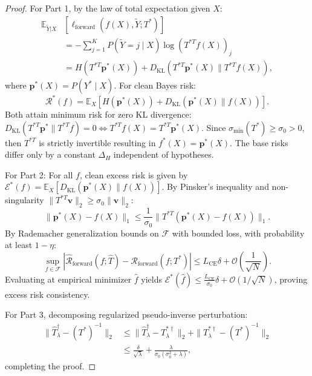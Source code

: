 \documentclass[10pt,journal]{IEEEtran}
\begin{document}
\begin{proof}
For Part 1, by the law of total expectation given $X$:
\begin{align}
    \mathbb{E}_{\tilde{Y}|X}&\left[\ell_{\mathrm{forward}}(f(X), \tilde{Y}; T^*)\right] \nonumber \\
    &= -\sum_{j=1}^K P(\tilde{Y}=j \mid X) \log (T^{*T} f(X))_j \nonumber \\
    &= H(T^{*T} \mathbf{p}^*(X)) + D_{\mathrm{KL}}(T^{*T} \mathbf{p}^*(X) \parallel T^{*T} f(X)),
\end{align}
where $\mathbf{p}^*(X) = P(Y^* \mid X)$. For clean Bayes risk:
\begin{equation}
    \mathcal{R}^*(f) = \mathbb{E}_X [H(\mathbf{p}^*(X)) + D_{\mathrm{KL}}(\mathbf{p}^*(X) \parallel f(X))].
\end{equation}
Both attain minimum risk for zero KL divergence: $D_{\mathrm{KL}}(T^{*T} \mathbf{p}^* \parallel T^{*T} f) = 0 \iff T^{*T} f(X) = T^{*T} \mathbf{p}^*(X)$. Since $\sigma_{\min}(T^*) \ge \sigma_0 > 0$, then $T^{*T}$ is strictly invertible resulting in $f^*(X) = \mathbf{p}^*(X)$. The base risks differ only by a constant $\Delta_H$ independent of hypotheses.

For Part 2: For all $f$, clean excess risk is given by $\mathcal{E}^*(f) = \mathbb{E}_X [D_{\mathrm{KL}}(\mathbf{p}^*(X) \parallel f(X))]$. By Pinsker's inequality and non-singularity $\|T^{*T}\mathbf{v}\|_2 \ge \sigma_0 \|\mathbf{v}\|_2$:
\begin{equation}
    \|\mathbf{p}^*(X) - f(X)\|_1 \le \frac{1}{\sigma_0} \|T^{*T}(\mathbf{p}^*(X) - f(X))\|_1.
\end{equation}
By Rademacher generalization bounds on $\mathcal{F}$ with bounded loss, with probability at least $1 - \eta$:
\begin{equation}
    \sup_{f \in \mathcal{F}} |\hat{\mathcal{R}}_{\mathrm{forward}}(f; \hat{T}) - \mathcal{R}_{\mathrm{forward}}(f; T^*)| \le L_{\mathrm{CE}} \delta + \mathcal{O}\left(\frac{1}{\sqrt{N}}\right).
\end{equation}
Evaluating at empirical minimizer $\hat{f}$ yields $\mathcal{E}^*(\hat{f}) \le \frac{L_{\mathrm{CE}}}{\sigma_0} \delta + \mathcal{O}(1/\sqrt{N})$, proving excess risk consistency.

For Part 3, decomposing regularized pseudo-inverse perturbation:
\begin{align}
    \|\hat{T}^{\dagger}_\lambda - (T^*)^{-1}\|_2 &\le \|\hat{T}^{\dagger}_\lambda - T^{*\dagger}_\lambda\|_2 + \|T^{*\dagger}_\lambda - (T^*)^{-1}\|_2 \nonumber \\
    &\le \frac{\delta}{\sqrt{\lambda}} + \frac{\lambda}{\sigma_0(\sigma_0^2 + \lambda)},
\end{align}
completing the proof.
\end{proof}
\end{document}
